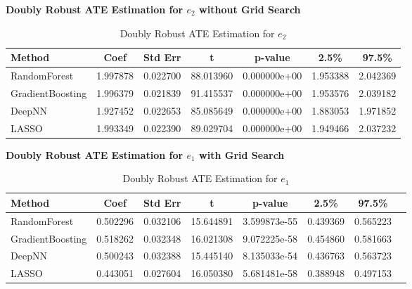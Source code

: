 \documentclass{article}
\begin{document}
\begin{table}[H]
  \textbf{Doubly Robust ATE Estimation for $e_2$ without Grid Search}
  \centering
  \renewcommand{\arraystretch}{1.5}
  \begin{tabular}{|l|c|c|c|c|c|c|}
    \hline
    \textbf{Method} & \textbf{Coef} & \textbf{Std Err} & \textbf{t} & \textbf{p-value} & \textbf{2.5\%} & \textbf{97.5\%} \\
    \hline
    RandomForest & 1.997878 & 0.022700 & 88.013960 & 0.000000e+00 & 1.953388 & 2.042369 \\ \hline
    GradientBoosting & 1.996379 & 0.021839 & 91.415537 & 0.000000e+00 & 1.953576 & 2.039182 \\ \hline
    DeepNN & 1.927452 & 0.022653 & 85.085649 & 0.000000e+00 & 1.883053 & 1.971852 \\ \hline
    LASSO & 1.993349 & 0.022390 & 89.029704 & 0.000000e+00 & 1.949466 & 2.037232 \\ \hline
  \end{tabular}
  \caption{Doubly Robust ATE Estimation for $e_2$}
\end{table}


\begin{table}[H]
  \textbf{Doubly Robust ATE Estimation for $e_1$ with Grid Search}
  \centering
  \renewcommand{\arraystretch}{1.5}
  \begin{tabular}{|l|c|c|c|c|c|c|c|}
    \hline
    \textbf{Method} & \textbf{Coef} & \textbf{Std Err} & \textbf{t} & \textbf{p-value} & \textbf{2.5\%} & \textbf{97.5\%} \\
    \hline
    RandomForest & 0.502296 & 0.032106 & 15.644891 & 3.599873e-55 & 0.439369 & 0.565223 \\ \hline
    GradientBoosting & 0.518262 & 0.032348 & 16.021308 & 9.072225e-58 & 0.454860 & 0.581663 \\ \hline
    DeepNN & 0.500243 & 0.032388 & 15.445140 & 8.135033e-54 & 0.436763 & 0.563723 \\ \hline
    LASSO & 0.443051 & 0.027604 & 16.050380 & 5.681481e-58 & 0.388948 & 0.497153 \\ \hline
  \end{tabular}
  \caption{Doubly Robust ATE Estimation for $e_1$}
\end{table}
\end{document}
